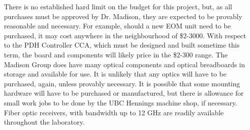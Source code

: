 There is no established hard limit on the budget for this project, but, as all
purchases must be approved by Dr. Madison, they are expected to be provably
reasonable and necessary. For example, should a new EOM unit need to be
purchased, it may cost anywhere in the neighbourhood of \$2-3000. With respect
to the PDH Controller CCA, which must be designed and built sometime this
term, the board and components will likely price in the \$2-300 range.
The Madison Group does have many optical components and optical breadboards
in storage and available for use. It is unlikely that any optics will have to
be purchased, again, unless provably necessary. It is possible that some
mounting hardware will have to be purchased or manufactured, but there is
allowance for small work jobs to be done by the UBC Hennings machine shop,
if necessary. Fiber optic receivers, with bandwidth up to 12 GHz are readily
available throughout the laboratory.
